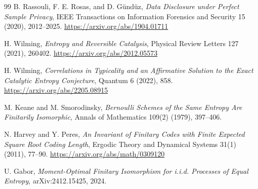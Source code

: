 \documentclass[11pt,a4paper]{article}
\newcommand{\1}{\mathbf 1}
\begin{document}
\begin{thebibliography}{99}
B. Rassouli, F. E. Rosas, and D. Gündüz,
\emph{Data Disclosure under Perfect Sample Privacy},
IEEE Transactions on Information Forensics and Security 15 (2020),
2012--2025.
\url{https://arxiv.org/abs/1904.01711}

H. Wilming,
\emph{Entropy and Reversible Catalysis},
Physical Review Letters 127 (2021), 260402.
\url{https://arxiv.org/abs/2012.05573}

H. Wilming,
\emph{Correlations in Typicality and an Affirmative Solution to the
Exact Catalytic Entropy Conjecture},
Quantum 6 (2022), 858.
\url{https://arxiv.org/abs/2205.08915}

M. Keane and M. Smorodinsky,
\emph{Bernoulli Schemes of the Same Entropy Are Finitarily Isomorphic},
Annals of Mathematics 109(2) (1979), 397--406.

N. Harvey and Y. Peres,
\emph{An Invariant of Finitary Codes with Finite Expected Square Root
Coding Length},
Ergodic Theory and Dynamical Systems 31(1) (2011), 77--90.
\url{https://arxiv.org/abs/math/0309120}

U. Gabor,
\emph{Moment-Optimal Finitary Isomorphism for i.i.d. Processes of Equal
Entropy},
arXiv:2412.15425, 2024.

\end{thebibliography}
\end{document}
